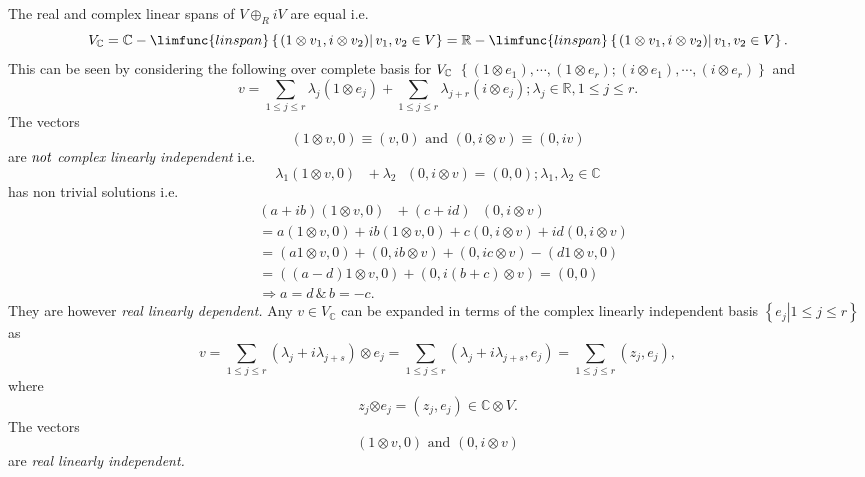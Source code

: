 \documentclass[aps,preprint]{revtex4}
\begin{document}
The real and complex linear spans of $V\oplus_{R}iV$ are equal i.e. 
\begin{equation}
V_{\mathbb{C}}=\mathbb{C}-\limfunc{linspan}\left\{ \left. \left( 1\otimes
v_{1},i\otimes v_{2}\right) \right\vert v_{1},v_{2}\in V\right\} =\mathbb{R}-%
\limfunc{linspan}\left\{ \left. \left( 1\otimes v_{1},i\otimes v_{2}\right)
\right\vert v_{1},v_{2}\in V\right\} .
\end{equation}
This can be seen by considering the following over complete basis for $V_{%
\mathbb{C}}$ $\left\{ \left( 1\otimes e_{1}\right) ,\cdots,\left( 1\otimes
e_{r}\right) ;\left( i\otimes e_{1}\right) ,\cdots,\left( i\otimes
e_{r}\right) \right\} $ and 
\begin{equation}
v=\sum_{1\leq j\leq r}\lambda_{j}\left( 1\otimes e_{j}\right) +\sum_{1\leq
j\leq r}\lambda_{j+r}\left( i\otimes e_{j}\right) ;\lambda_{j}\in \mathbb{R}%
,1\leq j\leq r.
\end{equation}
The vectors 
\begin{equation}
\left( 1\otimes v,0\right) \equiv\left( v,0\right) \text{ and }\left(
0,i\otimes v\right) \equiv\left( 0,iv\right)
\end{equation}
are $\emph{not}$ \emph{complex linearly independent }i.e. 
\begin{equation}
\lambda_{1}\left( 1\otimes v,0\right) \text{ }+\lambda_{2}\text{ }\left(
0,i\otimes v\right) =\left( 0,0\right) ;\lambda_{1},\lambda_{2}\in\mathbb{C}
\end{equation}
has non trivial solutions i.e. 
\begin{align}
& \left( a+ib\right) \left( 1\otimes v,0\right) \text{ }+\left( c+id\right) 
\text{ }\left( 0,i\otimes v\right) \\
& =a\left( 1\otimes v,0\right) +ib\left( 1\otimes v,0\right) +c\left(
0,i\otimes v\right) +id\left( 0,i\otimes v\right) \\
& =\left( a1\otimes v,0\right) +\left( 0,ib\otimes v\right) +\left(
0,ic\otimes v\right) -\left( d1\otimes v,0\right) \\
& =\left( \left( a-d\right) 1\otimes v,0\right) +\left( 0,i\left( b+c\right)
\otimes v\right) =\left( 0,0\right) \\
& \Rightarrow a=d\,\&\,b=-c.
\end{align}
They are however \emph{real linearly dependent.} Any $v\in V_{\mathbb{C}}$
can be expanded in terms of the complex linearly independent basis $\left\{
\left. e_{j}\right\vert 1\leq j\leq r\right\} $ as 
\begin{equation}
v=\sum_{1\leq j\leq r}\left( \lambda_{j}+i\lambda_{j+s}\right) \otimes
e_{j}=\sum_{1\leq j\leq r}\left( \lambda_{j}+i\lambda_{j+s},e_{j}\right)
=\sum_{1\leq j\leq r}\left( z_{j},e_{j}\right) ,
\end{equation}
where 
\begin{equation}
z_{j}\mathbb{\otimes}e_{j}=\left( z_{j},e_{j}\right) \in\mathbb{C\otimes}V.
\end{equation}
The vectors 
\begin{equation}
\left( 1\otimes v,0\right) \text{ and }\left( 0,i\otimes v\right)
\end{equation}
are \emph{real linearly independent. }
\end{document}
